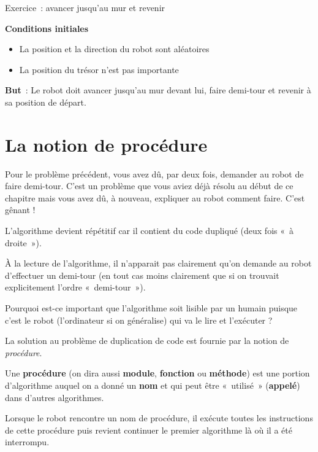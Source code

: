 	
	\begin{Emphase}[exercice]{Exercice~: avancer jusqu'au mur et revenir}

		\textbf{Conditions initiales}

		\begin{itemize}
		\item La position et la direction du robot sont aléatoires
		\item La position du trésor n'est pas importante
		\end{itemize}
		
		\textbf{But}~: Le robot doit avancer jusqu'au mur
		devant lui, faire demi-tour et revenir à sa position de départ.

	\end{Emphase}

\section{La notion de procédure}

	Pour le problème précédent, vous avez dû, par deux fois, demander au
	robot de faire demi-tour. C'est un problème que vous
	aviez déjà résolu au début de ce chapitre mais vous avez dû, à nouveau,
	expliquer au robot comment faire. C'est gênant !

	\begin{liste}
	\item 
		L'algorithme devient répétitif car il contient du code dupliqué
		(deux fois «~à droite~»).
	\item 
		À la lecture de l'algorithme, 
		il n'apparait pas clairement qu'on demande au robot 
		d'effectuer un demi-tour
		(en tout cas moins clairement que si on trouvait explicitement
		l'ordre «~demi-tour~»).
	\end{liste}

	Pourquoi est-ce important que l'algorithme soit lisible
	par un humain puisque c'est le robot
	(l'ordinateur si on généralise) qui va le lire et
	l'exécuter ?

	La solution au problème de duplication de code est fournie par la notion
	de \textit{procédure}.

	Une \textbf{procédure} (on dira aussi \textbf{module}, \textbf{fonction}
	ou \textbf{méthode}) est une portion d'algorithme
	auquel on a donné un \textbf{nom} et qui peut être «~utilisé~»
	(\textbf{appelé}) dans d'autres algorithmes.

	Lorsque le robot rencontre un nom de procédure, il exécute toutes les
	instructions de cette procédure puis revient continuer le premier
	algorithme là où il a été interrompu.

